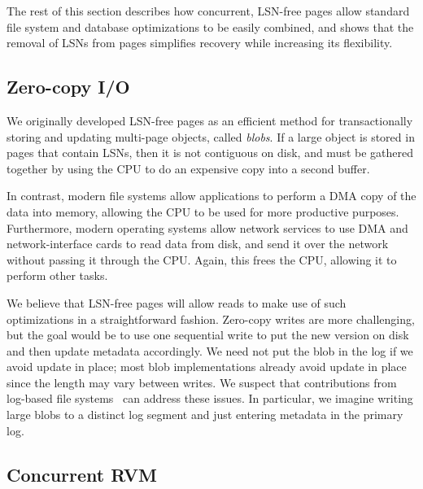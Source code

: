 \documentclass[letterpaper,twocolumn,10pt]{article}
\newcommand{\yad}{Stasis\xspace}
\begin{document}
The rest of this section describes how concurrent, LSN-free pages 
allow standard file system and database optimizations to be easily
combined, and shows that the removal of LSNs from pages
simplifies recovery while increasing its flexibility.

\subsection{Zero-copy I/O} 

We originally developed LSN-free pages as an efficient method for
transactionally storing and updating multi-page objects, called {\em
blobs}.  If a large object is stored in pages that contain LSNs, then it is not contiguous on disk, and must be gathered together by using the CPU to do an expensive copy into a second buffer.

In contrast, modern file systems allow applications to
perform a DMA copy of the data into memory, allowing the CPU to be used for
more productive purposes.  Furthermore, modern operating systems allow
network services to use DMA and network-interface cards to read data
from disk, and send it over the network without passing it
through the CPU.  Again, this frees the CPU, allowing it to perform
other tasks.

We believe that LSN-free pages will allow reads to make use of such
optimizations in a straightforward fashion.  Zero-copy writes are
 more challenging, but the goal would be to use one sequential write
to put the new version on disk and then update metadata accordingly.
We need not put the blob in the log if we avoid update in place; most
blob implementations already avoid update in place since the length may vary between writes.  We suspect that contributions from log-based file
systems~\cite{lfs} can address these issues. In particular, we
imagine writing large blobs to a distinct log segment and just
entering metadata in the primary log.


\subsection{Concurrent RVM}
\end{document}
